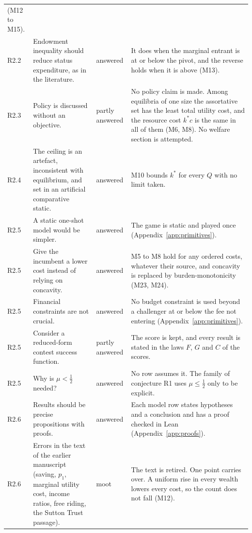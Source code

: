 \begin{longtable}{@{}P{1.3cm}P{5.7cm}P{1.9cm}P{7.0cm}@{}}
  (M12 to M15). \\
R2.2 & Endowment inequality should reduce status expenditure, as in the
  literature. & answered & It does when the marginal entrant is at or below the
  pivot, and the reverse holds when it is above (M13). \\
R2.3 & Policy is discussed without an objective. & partly answered & No
  policy claim is made. Among equilibria of one size the assortative set has the
  least total utility cost, and the resource cost $k^*c$ is the same in all of
  them (M6, M8). No welfare section is attempted. \\
R2.4 & The ceiling is an artefact, inconsistent with equilibrium, and set in
  an artificial comparative static. & answered & M10 bounds $k^*$ for every
  $Q$ with no limit taken. \\
R2.5 & A static one-shot model would be simpler. & answered & The game is
  static and played once (Appendix~\ref{app:primitives}). \\
R2.5 & Give the incumbent a lower cost instead of relying on concavity. &
  answered & M5 to M8 hold for any ordered costs, whatever their source, and
  concavity is replaced by burden-monotonicity (M23, M24). \\
R2.5 & Financial constraints are not crucial. & answered & No budget
  constraint is used beyond a challenger at or below the fee not entering
  (Appendix~\ref{app:primitives}). \\
R2.5 & Consider a reduced-form contest success function. & partly answered &
  The score is kept, and every result is stated in the laws $F$, $G$ and $C$
  of the scores. \\
R2.5 & Why is $\mu<\tfrac12$ needed? & answered & No row assumes it. The
  family of conjecture R1 uses $\mu\le\tfrac12$ only to be explicit. \\
R2.6 & Results should be precise propositions with proofs. & answered & Each
  model row states hypotheses and a conclusion and has a proof checked in
  Lean (Appendix~\ref{app:proofs}). \\
R2.6 & Errors in the text of the earlier manuscript (saving, $p_1$,
  marginal utility cost, income ratios, free riding, the Sutton Trust
  passage). & moot & The text is retired. One point carries over. A uniform
  rise in every wealth lowers every cost, so the count does not fall (M12). \\
\end{longtable}
\normalsize





